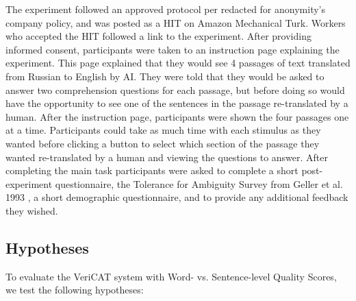 The experiment followed an approved protocol per redacted for anonymity’s company policy, and was posted as a HIT on Amazon Mechanical Turk. Workers who accepted the HIT followed a link to the experiment. After providing informed consent, participants were taken to an instruction page explaining the experiment. This page explained that they would see 4 passages of text translated from Russian to English by AI. They were told that they would be asked to answer two comprehension questions for each passage, but before doing so would have the opportunity to see one of the sentences in the passage re-translated by a human. After the instruction page, participants were shown the four passages one at a time. Participants could take as much time with each stimulus as they wanted before clicking a button to select which section of the passage they wanted re-translated by a human and viewing the questions to answer. After completing the main task participants were asked to complete a short post-experiment questionnaire, the Tolerance for Ambiguity Survey from Geller et al. 1993 \cite{gellerTolerance1993}, a short demographic questionnaire, and to provide any additional feedback they wished.

\subsection{Hypotheses}


To evaluate the VeriCAT system with Word- vs. Sentence-level Quality Scores, we test the following hypotheses:

